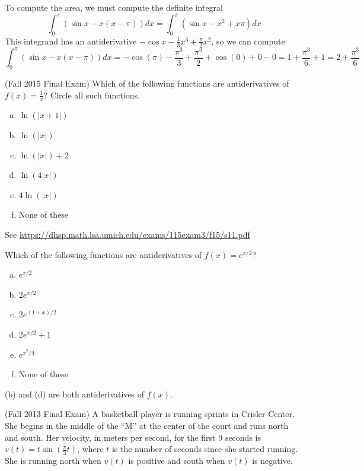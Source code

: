 \documentclass[11pt]{exam}
\begin{document}
\begin{questions}
\begin{solution}
      To compute the area, we must compute the definite integral \[
        \int_0^\pi (\sin x - x(x-\pi)) dx = \int_0^\pi (\sin x - x^2 +
        x\pi) dx
      \]
      This integrand has an antiderivative \(-\cos x - \frac{1}{3} x^3 +
      \frac{\pi}{2} x^2\), so we can compute \[
        \int_0^\pi (\sin x - x(x-\pi)) dx = -\cos(\pi) -
        \frac{\pi^3}{3} + \frac{\pi^3}{2} + \cos(0) + 0 - 0 = 1 +
        \frac{\pi^3}{6} + 1 = 2 + \frac{\pi^3}{6}
      \]
    \end{solution}
   \pagebreak
  \question (Fall 2015 Final Exam)
    Which of the following functions are antiderivatives of \(f(x) =
    \frac{1}{x}\)? Circle all such functions.
    \begin{multicols}{3}
      \begin{enumerate}[(a)]
      \item \(\ln(|x+1|)\)
      \item \(\ln(|x|)\)
      \item \(\ln(|x|)+2\)
      \item \(\ln(4|x|)\)
      \item \(4 \ln(|x|)\)
      \item None of these
      \end{enumerate}
    \end{multicols}
    \begin{solution}
      See \href{https://dhsp.math.lsa.umich.edu/exams/115exam3/f15/s11.pdf}{https://dhsp.math.lsa.umich.edu/exams/115exam3/f15/s11.pdf}
    \end{solution}
  \question Which of the following functions are antiderivatives of
    \(f(x) = e^{x/2}\)?
    \begin{multicols}{3}
      \begin{enumerate}[(a)]
      \item \(e^{x/2}\)
      \item \(2e^{x/2}\)
      \item \(2 e^{(1+x)/2}\)
      \item \(2 e^{x/2} + 1\)
      \item \(e^{x^2/4}\)
      \item None of these
      \end{enumerate}
    \end{multicols}
    \begin{solution}
      (b) and (d) are both antiderivatives of \(f(x)\).
    \end{solution}
  \question (Fall 2013 Final Exam)
A basketball player is running sprints in Crisler Center. She begins in the middle
of the “M” at the center of the court and runs north and south. Her velocity, in meters per
second, for the first 9 seconds is \(v(t) = t \sin (\frac{\pi}
{3} t)\), where \(t\) is the number of seconds since she
started running. She is running north when \(v(t)\) is positive and south when \(v(t)\) is negative.
\begin{parts}

\end{parts}
\end{questions}
\end{document}
